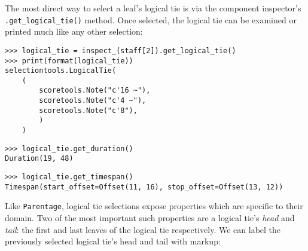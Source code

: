 \noindent The most direct way to select a leaf's logical tie is via the
component inspector's \texttt{.get\_logical\_tie()} method. Once selected, the
logical tie can be examined or printed much like any other selection:

\begin{comment}
<abjad>
logical_tie = inspect_(staff[2]).get_logical_tie()
print(format(logical_tie))
logical_tie.get_duration()
logical_tie.get_timespan()
</abjad>
\end{comment}

\begin{abjadbookoutput}
\begin{singlespacing}
\vspace{-0.5\baselineskip}
\begin{lstlisting}
>>> logical_tie = inspect_(staff[2]).get_logical_tie()
>>> print(format(logical_tie))
selectiontools.LogicalTie(
    (
        scoretools.Note("c'16 ~"),
        scoretools.Note("c'4 ~"),
        scoretools.Note("c'8"),
        )
    )
\end{lstlisting}
\begin{lstlisting}
>>> logical_tie.get_duration()
Duration(19, 48)
\end{lstlisting}
\begin{lstlisting}
>>> logical_tie.get_timespan()
Timespan(start_offset=Offset(11, 16), stop_offset=Offset(13, 12))
\end{lstlisting}
\end{singlespacing}
\end{abjadbookoutput}

\noindent Like \texttt{Parentage}, logical tie selections expose properties
which are specific to their domain. Two of the most important such properties
are a logical tie's \emph{head} and \emph{tail}: the first and last leaves of
the logical tie respectively. We can label the previously selected logical
tie's head and tail with markup:

\begin{comment}
<abjad>
logical_tie.head
logical_tie.tail
head_markup = Markup('head', direction=Up)
head_markup = head_markup.pad_around(0.5).box().pad_around(0.5)
tail_markup = Markup('tail', direction=Up)
tail_markup = tail_markup.pad_around(0.5).box().pad_around(0.5)
attach(head_markup, logical_tie.head)
attach(tail_markup, logical_tie.tail)
show(staff)
</abjad>
\end{comment}

